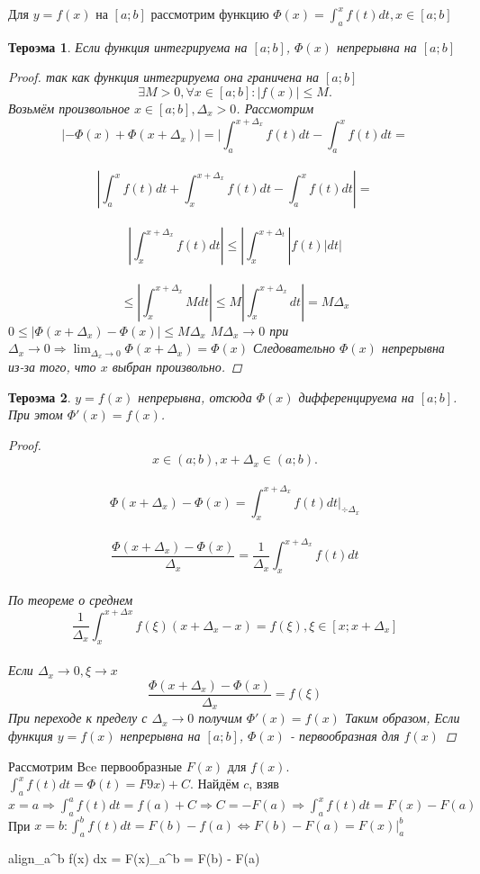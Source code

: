 \documentclass[oneside]{book}
\newcommand{\boxedeq}[2]{\begin{empheq}[box={\fboxsep=6pt\fbox}]{align}\label{#1}#2\end{empheq}}
\newtheorem{thm}{Тероэма}[chapter] %
\begin{document}
\begin{enumerate}
\begin{itemize}
\begin{enumerate}
Для $y = f(x)$ на $[a;b]$ рассмотрим функцию $\Phi(x) = \int_{a}^x f(t) dt, x \in [a;b]$
\begin{thm}
  Если функция интегрируема на $[a;b]$, $\Phi(x)$ непрерывна на $[a;b]$
  \begin{proof}
    так как функция интегрируема она граничена на $[a;b]$ $$
      \exists M > 0, \forall x \in [a;b]: |f(x)| \leq M.
    $$
    Возьмём произвольное $x \in [a;b], \Delta_x > 0$.
    Рассмотрим $$
      |-\Phi(x) + \Phi(x+\Delta_x)| = |\int_{a}^{x+\Delta_x} f(t) dt - \int_{a}^x f(t) dt = $$\\$$
      |\int_{a}^x f(t) dt + \int_{x}^{x+\Delta_x} f(t) dt - \int_{a}^x f(t) dt| = $$\\$$
      |\int_{x}^{x+\Delta_x} f(t) dt| \leq |\int_{x}^{x+\Delta_t} |f(t)| dt| $$\\$$
      \leq |\int_{x}^{x+\Delta_x} M dt| \leq M|\int_{x}^{x+\Delta_x} dt| = M\Delta_x
      $$ $ 0 \leq |\Phi(x+\Delta_x) - \Phi(x)| \leq M\Delta_x $
      $M\Delta_x \rightarrow 0 $ при $ \Delta_x \rightarrow 0 \Rightarrow \lim_{\Delta_x \rightarrow 0}{\Phi(x+\Delta_x)} = \Phi(x)$
      Следовательно $\Phi(x)$ непрерывна из-за того, что $x$ выбран произвольно.
  \end{proof}
\end{thm}
\begin{thm}
  $y = f(x)$ непрерывна, отсюда $\Phi(x)$ дифференцируема на $[a;b]$. При этом $\Phi'(x) = f(x)$.
  \begin{proof}
    $$
      x \in (a;b), x + \Delta_x \in (a;b). $$\\$$
      \Phi (x+\Delta_x) - \Phi(x) = \int_{x}^{x+\Delta_x} f(t) dt \vert_{\div \Delta_x}$$\\$$
      \frac{\Phi(x+\Delta_x) - \Phi(x)}{\Delta_x} = \frac{1}{\Delta_x}\int_{x}^{x+\Delta_x} f(t) dt$$\\
    По теореме о среднем $$
      \frac{1}{\Delta_x} \int_{x}^{x+\Delta x} f(\xi)(x+\Delta_x - x) = f(\xi), \xi \in [x; x+\Delta_x]$$\\
      Если $\Delta_x \rightarrow 0, \xi \rightarrow x$ $$
        \frac{\Phi(x+\Delta_x) - \Phi(x)}{\Delta_x} = f(\xi)
      $$ При переходе к пределу с $\Delta_x \rightarrow 0$ получим $\Phi'(x) = f(x)$
      Таким образом, Если функция $y = f(x)$ непрерывна на $[a;b]$, $\Phi(x)$ - первообразная для $f(x)$
  \end{proof}
\end{thm}
Рассмотрим Вce первообразные $F(x)$ для $f(x)$. $\int_{a}^x f(t) dt = \Phi(t) = F9x)+C$.
Найдём $c$, взяв $x = a \Rightarrow \int_{a}^a f(t) dt = f(a)+C \Rightarrow C = -F(a) \Rightarrow \int_{a}^x f(t) dt = F(x) - F(a)$ \\
При $x = b: \int_{a}^b f(t) dt = F(b) - f(a) \Leftrightarrow F(b) - F(a) = F(x)\vert_{a}^{b}$
\boxedeq{eq:*}{\int_{a}^b f(x) dx = F(x)\vert_{a}^{b} = F(b) - F(a)}



\end{enumerate}
\end{itemize}
\end{enumerate}
\end{document}

